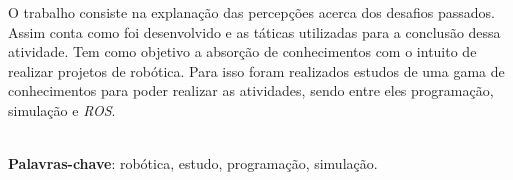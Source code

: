 \begin{thesisresumo}

    O trabalho consiste na explanação das percepções acerca dos desafios passados. Assim conta como foi desenvolvido e as táticas utilizadas para a conclusão dessa atividade. Tem como objetivo a absorção de  conhecimentos com o intuito de realizar projetos de robótica. Para isso foram realizados estudos de uma gama de conhecimentos para poder realizar as atividades, sendo entre eles programação, simulação e \textit{ROS}.




\ \\


\textbf{Palavras-chave}: robótica, estudo, programação, simulação.

\end{thesisresumo}
